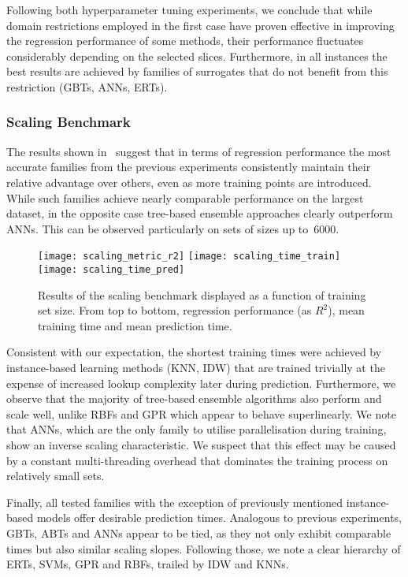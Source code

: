 Following both hyperparameter tuning experiments, we conclude that while domain
restrictions employed in the first case have proven effective in improving the
regression performance of some methods, their performance fluctuates considerably
depending on the selected slices. Furthermore, in all instances the best
results are achieved by families of surrogates that do not benefit from this
restriction (GBTs, ANNs, ERTs).


\subsubsection{Scaling Benchmark}

The results shown in~ suggest that in terms of regression
performance the most accurate families from the previous experiments
consistently maintain their relative advantage over others, even as
more training points are introduced. While such families achieve nearly comparable
performance on the largest dataset, in the opposite case tree-based ensemble approaches
clearly outperform ANNs. This can be observed
particularly on sets of sizes up to~\num{6000}.

\begin{figure}
	\centering
	\texttt{[image: scaling\_metric\_r2]}
	\texttt{[image: scaling\_time\_train]}
	\texttt{[image: scaling\_time\_pred]}
	\caption{Results of the scaling benchmark displayed as a function of
	training set size. From top to bottom, regression performance (as $R^2$),
	mean training time and mean prediction time.}
	\label{fig:scaling}
\end{figure}

Consistent with our expectation, the shortest training times were achieved by
instance-based learning methods (KNN, IDW) that
are trained trivially at the expense of increased lookup complexity later during prediction.
Furthermore, we observe that the majority of tree-based ensemble algorithms also perform
and scale well, unlike RBFs and GPR which appear to behave superlinearly. We note that ANNs,
which are the only family to utilise parallelisation during training, show an
inverse scaling characteristic. We suspect that this effect may be caused
by a constant multi-threading overhead that dominates the training process
on relatively small sets.

Finally, all tested families with the exception of previously mentioned instance-based
models offer desirable prediction times. Analogous to previous experiments,
GBTs, ABTs and ANNs appear to be tied, as they not only exhibit
comparable times but also similar scaling slopes. Following those, we note a
clear hierarchy of ERTs, SVMs, GPR and RBFs, trailed by IDW and KNNs.


